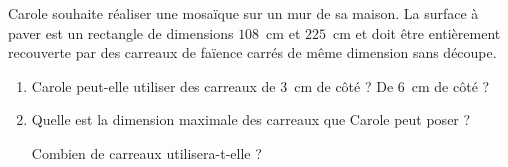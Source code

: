 
\medskip

Carole souhaite réaliser une mosaïque sur un mur de sa maison. La surface à paver est un
rectangle de dimensions $108$~cm et $225$~cm et doit être entièrement recouverte par des carreaux
de faïence carrés de même dimension sans découpe.

\medskip

\begin{enumerate}
\item Carole peut-elle utiliser des carreaux de 3~cm de côté ? De 6~cm de côté ?
\item Quelle est la dimension maximale des carreaux que Carole peut poser ?

Combien de carreaux utilisera-t-elle ?
\end{enumerate}

\vspace{0,5cm}

